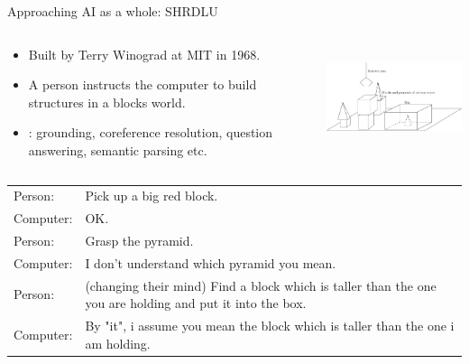 \documentclass[usenames,dvipsnames,notes,11pt,aspectratio=169]{beamer}
\newcommand{\pdfnote}[1]{}
\begin{document}
\begin{frame}
    {Approaching AI as a whole: SHRDLU}
    \begin{columns}
        \begin{column}{0.6\textwidth}
    \begin{itemize}
        \item Built by Terry Winograd at MIT in 1968.
        \item A person instructs the computer to build structures in a blocks world.
        \item {}: grounding, coreference resolution, question answering, semantic parsing etc. 
    \end{itemize}
        \end{column}
        \begin{column}{0.4\textwidth}
    \begin{center}
    \includegraphics[height=3cm]{figures/shrdlu}
    \end{center}
        \end{column}
    \end{columns}
    \begin{table}
        \begin{tabular}{lp{12cm}}
            Person:& Pick up a big red block.\\
            Computer:& OK.\\
            Person:& Grasp the pyramid.\\
            Computer:& I don't understand which pyramid you mean.\\
            Person:& (changing their mind) Find a block which is taller than the one you are holding and put it into the box.\\
            Computer:& By "it", i assume you mean the block which is taller than the one i am holding.
    \end{tabular}
    \end{table}
    \pdfnote{Another feature of early efforts in AI is that people try to build general AI systems as opposed to domain/task specific systems.}
    \pdfnote{Terry Winograd’s SHRDLU is another successful demonstration of AI. It can interact with users in natural language and take actions in blocks world. The system demonstrated advanced language understanding skills in this simple world, e.g., grounding, question answering, semantic parsing, coreference resolution, clarification etc. Unfortunately, subsequent effort in scaling it up to more complex settings failed, which is a common weakness of earlier AI systems.}
\end{frame}
\end{document}
